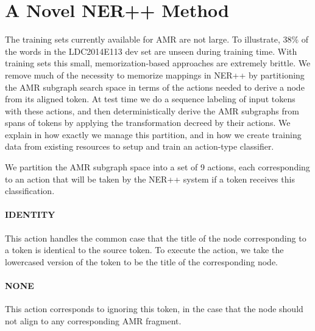 \documentclass[11pt]{article}
\begin{document}


\section{A Novel NER++ Method}\label{sec:nerplusplus}
The training sets currently available for AMR are not large.
To illustrate, 38\% of the words in the LDC2014E113 dev set are 
  unseen during training time. 
With training sets this small, memorization-based approaches are extremely brittle.
We remove much of the necessity to memorize mappings in NER++
  by partitioning the AMR subgraph search space in terms of the actions needed to 
  derive a node from its aligned token. 
At test time we do a sequence labeling of input tokens with these actions, and 
  then deterministically derive the AMR subgraphs from spans of tokens by applying 
  the transformation decreed by their actions.
We explain in  how exactly we manage this partition, and in  how we create training data from existing resources to setup and train an action-type classifier.


We partition the AMR subgraph space into a set of 9 actions, each corresponding to an action that will be taken by the NER++ system if a token receives this classification.

\paragraph{IDENTITY} This action handles the common case that the title of the node corresponding to a token is identical to the source token. To execute the action, we take the lowercased version of the token to be the title of the corresponding node.

\paragraph{NONE} This action corresponds to ignoring this token, in the case that
  the node should not align to any corresponding AMR fragment.
\end{document}

